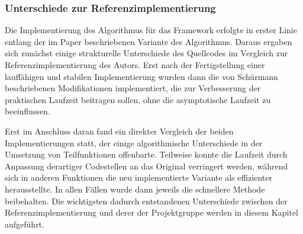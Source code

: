 \subsubsection{Unterschiede zur Referenzimplementierung}
\label{bpr:effizienz:modifikationen}

Die Implementierung des \bpr Algorithmus für das \sacabench Framework erfolgte in erster Linie entlang der im Paper \cite{saca:2} beschriebenen Variante des Algorithmus. Daraus ergaben sich zunächst einige strukturelle Unterschiede des Quellcodes im Vergleich zur Referenzimplementierung des Autors. Erst nach der Fertigstellung einer lauffähigen und stabilen Implementierung wurden dann die von Schürmann beschriebenen Modifikationen \cite[Kapitel 3]{saca:2} implementiert, die zur Verbesserung der praktischen Laufzeit beitragen sollen, ohne die asymptotische Laufzeit zu beeinflussen.\par
Erst im Anschluss daran fand ein direkter Vergleich der beiden Implementierungen statt, der einige algorithmische Unterschiede in der Umsetzung von Teilfunktionen offenbarte. Teilweise konnte die Laufzeit durch Anpassung derartiger Codestellen an das Original verringert werden, während sich in anderen Funktionen die neu implementierte Variante als effizienter herausstellte. In allen Fällen wurde dann jeweils die schnellere Methode beibehalten. Die wichtigsten dadurch entstandenen Unterschiede zwischen der Referenzimplementierung und derer der Projektgruppe werden in diesem Kapitel aufgeführt.


